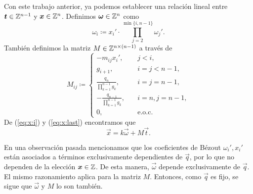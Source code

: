 Con este trabajo anterior, ya podemos establecer una relación lineal entre $\boldsymbol{t} \in \mathbb{Z}^{n-1}$ y
$\boldsymbol{x} \in \mathbb{Z}^n$. Definimos $\boldsymbol{\omega} \in \mathbb{Z}^n$ como
\begin{equation}
	\label{eq:vec-omega}
	\omega_i \coloneq x_i' \cdot \prod_{j = 2}^{\min{\lbrace i, n - 1 \rbrace}}\omega_j'.
\end{equation}
También definimos la matriz $M \in \mathbb{Z}^{n \times (n - 1)}$ a través de
\begin{equation}
	\label{eq:mat-T}
	M_{ij} \coloneq \begin{cases}
		-m_{ij}x_i', &\quad j < i, \\
		g_{i + 1},  &\quad i = j < n - 1, \\
		\frac{q_n}{\prod_{k=1}^{n-1}g_k}, &\quad i = j = n - 1, \\
		-\frac{q_{n-1}}{\prod_{k=1}^{n-1}g_k}, &\quad i = n, j = n - 1, \\
		0, &\quad \text{e.o.c.}
	\end{cases}
\end{equation}
De (\ref{eq:x:i}) y (\ref{eq:x:last}) encontramos que
\begin{equation}
	\label{eq:transf}
	\vec{x} = k\vec{\omega} + M\vec{t}.
\end{equation}

En una observación pasada mencionamos que los coeficientes de Bézout $\omega_i', x_i'$ están
asociados a términos exclusivamente dependientes de $\vec{q}$, por lo que no dependen de la elección
$\boldsymbol{x} \in \mathbb{Z}$. De esta manera, $\vec{\omega}$ depende exclusivamente de $\vec{q}$. El mismo
razonamiento aplica para la matriz $M$. Entonces, como $\vec{q}$ es fijo, se sigue que
$\vec{\omega}$ y $M$ lo son también.

